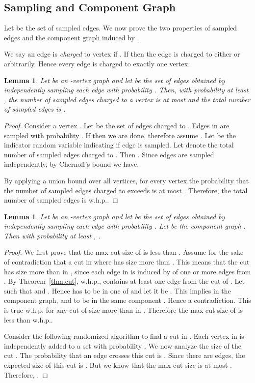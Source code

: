\documentclass[11pt]{article}
\newtheorem{lemma}[theorem]{Lemma}
\begin{document}
\subsection{Sampling and Component Graph}
Let  be the set of sampled edges. 
We now prove the two properties of sampled edges  and the component graph  induced by . 

We say an edge  is \textit{charged} to vertex  if .  
  If  then the edge  is charged to either  or  arbitrarily. 
  Hence every edge is charged to exactly one vertex.
\begin{lemma}\label{lemma:ssize}
  Let  be an -vertex graph  and let  be the set of edges obtained by independently sampling each edge  with probability . 
  Then, with probability at least , 
  the number of sampled edges charged to a vertex is at most  and 
  the total number of sampled edges is .
\end{lemma}
\begin{proof}
  Consider a vertex .
  Let  be the set of edges charged to .
  Edges in  are sampled with probability . 
  If  then we are done, therefore assume . 
  Let  be the indicator random variable indicating if edge  is sampled. 
  Let  denote the total number of sampled edges charged to . 
  Then . 
  Since edges are sampled independently, by Chernoff's bound we have, 
   
  By applying a union bound over all vertices, for every vertex  the probability that the number of sampled edges charged to  exceeds  is at most . 
  Therefore, the total number of sampled edges is  w.h.p..
\end{proof}

\begin{lemma}\label{lemma:smallcut}
  Let  be an -vertex graph  and let  be the set of edges obtained by independently sampling each edge  with probability . 
  Let  be the component graph . 
  Then with probability at least ,  .
\end{lemma}
\begin{proof} 
  We first prove that the max-cut size of  is less than . 
  Assume for the sake of contradiction that a cut  in  where  has size more than . 
  This means that the cut  has size more than  in , since each edge in  is induced by of one or more edges from .
  By Theorem~\ref{thm:cut}, w.h.p.,  contains at least one edge from the cut  of .
  Let  such that  and . 
  Hence  has to be in one of  and let it be . 
  This implies in the component graph,  and  to be in the same component . Hence a contradiction. 
  This is true w.h.p. for any cut of size more than  in . 
  Therefore the max-cut size of  is less than  w.h.p.. 

  \noindent Consider the following randomized algorithm to find a cut in . 
  Each vertex in  is independently added to a set  with probability . 
  We now analyze the size of the cut .  
  The probability that an edge crosses this cut is . 
  Since there are  edges, the expected size of this cut is . 
  But we know that the max-cut size is at most . Therefore, . 
\end{proof}
\end{document}
